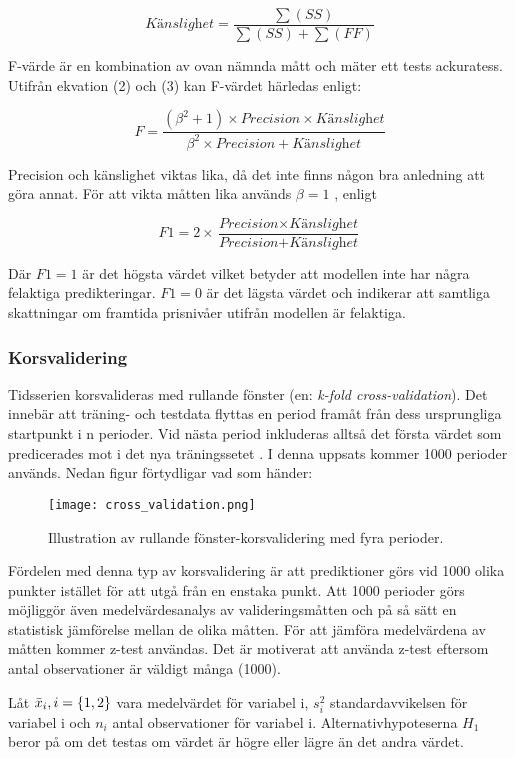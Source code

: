 \documentclass[12pt]{article}
\begin{document}
\begin{equation}
    \textit{Känslighet} = \frac{\sum(SS)}{\sum(SS)+\sum(FF)}
\end{equation}

F-värde är en kombination av ovan nämnda mått och mäter ett tests ackuratess. Utifrån ekvation (2) och (3) kan F-värdet härledas enligt:

\begin{equation}
    \textit{F} = \frac{(\beta^2+1) \times \textit{Precision} \times \textit{Känslighet}}{\beta^2 \times \textit{Precision} + \textit{Känslighet}}
\end{equation}

Precision och känslighet viktas lika, då det inte finns någon bra anledning att göra annat. För att vikta måtten lika används $\beta=1$ \parencite{ModelValidation}, enligt

\begin{equation}
    \textit{F1} = 2 \times \frac{\textit{Precision} \times \textit{Känslighet}}{\textit{Precision} + \textit{Känslighet}}
\end{equation}

Där $F1=1$ är det högsta värdet vilket betyder att modellen inte har några felaktiga predikteringar. $F1=0$ är det lägsta värdet och indikerar att samtliga skattningar om framtida prisnivåer utifrån modellen är felaktiga.


\subsubsection{Korsvalidering}
Tidsserien korsvalideras med rullande fönster (en: \textit{k-fold cross-validation}). Det innebär att träning- och testdata flyttas en period framåt från dess ursprungliga startpunkt i n perioder. Vid nästa period inkluderas alltså det första värdet som predicerades mot i det nya träningssetet \parencite{bergmeir2018note}. I denna uppsats kommer 1000 perioder används. Nedan figur förtydligar vad som händer:
\begin{figure}[H]
\caption{Illustration av rullande fönster-korsvalidering med fyra perioder.}
\texttt{[image: cross\_validation.png]}
\centering
\end{figure}
Fördelen med denna typ av korsvalidering är att prediktioner görs vid 1000 olika punkter istället för att utgå från en enstaka punkt. Att 1000 perioder görs möjliggör även medelvärdesanalys av valideringsmåtten och på så sätt en statistisk jämförelse mellan de olika måtten. För att jämföra medelvärdena av måtten kommer z-test användas. Det är motiverat att använda z-test eftersom antal observationer är väldigt många (1000). 
\par Låt \(\Bar{x}_i, i=\{1,2\}\) vara medelvärdet för variabel i, \(s_i^2\) standardavvikelsen för variabel i och \(n_i\) antal observationer för variabel i. Alternativhypoteserna \(H_1\) beror på om det testas om värdet är högre eller lägre än det andra värdet.
\end{document}
